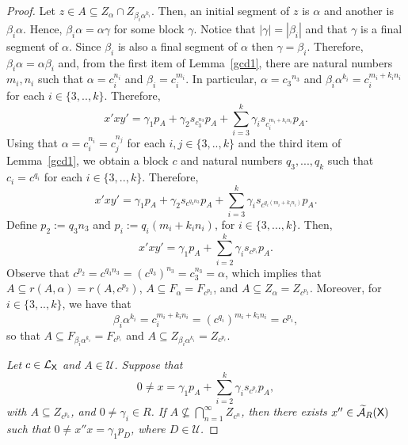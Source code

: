 \documentclass[a4paper,12pt]{amsart}
\theoremstyle{definition}
\theoremstyle{remark}
\numberwithin{equation}{section}
\newcommand{\osf}{{\normalfont \textsf{X}}}
\newcommand{\lang}{\CL_{\osf}}
\newcommand{\ualgshift}{\TCA_R(\osf)}
\newcommand{\CA}{\mathcal{A}}
\newcommand{\CL}{\mathcal{L}}
\newcommand{\TCA}{\widetilde{\CA}}
\newcommand{\TCB}{\mathcal{U}}
\begin{document}
\begin{proof}
Let $z\in A\subseteq Z_\alpha\cap Z_{\beta_i\alpha^{k_i}}$. Then, an initial segment of $z$ is $\alpha$ and another is $\beta_i \alpha$. Hence, $\beta_i \alpha=\alpha \gamma$ for some block $\gamma$. Notice that $|\gamma|=|\beta_i|$ and that $\gamma$ is a final segment of $\alpha$. Since $\beta_i$ is also a final segment of $\alpha$ then $\gamma=\beta_i$. Therefore, $\beta_i \alpha=\alpha\beta_i$ and, from the first item of Lemma~\ref{gcd1}, there are natural numbers $m_i,n_i$ such that $\alpha=c_i^{n_i}$ and $\beta_i=c_i^{m_i}$.
In particular, $\alpha={c_3}^{n_3}$ and  $\beta_i\alpha^{k_i}=c_i^{m_i+k_in_i}$ for each $i\in \{3,..,k\}$. Therefore, 
$$x'xy'=\gamma_1 p_A +\gamma_2 s_{c_3^{n_3}} p_A +\sum\limits_{i=3}^k \gamma_i s_{c_i^{m_i+k_in_i}}p_A.$$
Using that $\alpha=c_i^{n_i}=c_j^{n_j}$ for each $i,j\in \{3,..,k\}$ and the third item of Lemma~\ref{gcd1}, we obtain a block $c$ and natural numbers $q_3,...,q_k$ 
such that $c_i=c^{q_i}$ for each $i\in \{3,..,k\}$. Therefore, 
$$x'xy'=\gamma_1 p_A +\gamma_2 s_{c^{q_3n_3}} p_A +\sum\limits_{i=3}^k \gamma_i s_{c^{q_i(m_i+k_in_i)}}p_A.$$  Define $p_2:=q_3n_3$ and $p_i:=q_i(m_i+k_in_i)$, for $i\in \{3,...,k\}$. Then, 
$$x'xy'=\gamma_1 p_A +\sum\limits_{i=2}^k \gamma_i s_{c^{p_i}}p_A.$$
Observe that $c^{p_2}=c^{q_3n_3}=(c^{q_3})^{n_3}=c_3^{n_3}=\alpha$, which implies that $A\subseteq r(A,\alpha)=r(A,c^{p_2})$, $A\subseteq F_{\alpha}=F_{c^{p_2}}$, and $A\subseteq Z_{\alpha}=Z_{c^{p_2}}$. Moreover, for $i\in \{3,..,k\}$, we have that $$\beta_i\alpha^{k_i}=c_i^{m_i+k_in_i}=(c^{q_i})^{m_i+k_in_i}=c^{p_i},$$ so that $A\subseteq F_{\beta_i\alpha^{k_i}}=F_{c^{p_i}}$ and $A\subseteq Z_{\beta_i\alpha^{k_i}}=Z_{c^{p_i}}$.




\smallskip
{}
{\it Let $c\in \lang$ and $A\in \TCB$. Suppose that $$0\neq x =\gamma_1p_A+\sum\limits_{i=2}^k\gamma_i s_{c^{p_i}}p_A,$$ with $A\subseteq Z_{c^{p_k}}$, and $0\neq \gamma_i\in R$. If $A\nsubseteq \bigcap \limits_{n=1}^\infty Z_{c^n}$, then there exists $x''\in \ualgshift$ such that $0\neq x''x=\gamma_1 p_D$, where $D\in \TCB$.}
\smallskip


\end{proof}
\end{document}
